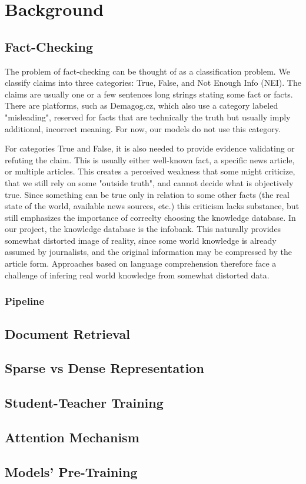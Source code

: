 \chapter{Background}

\section{Fact-Checking}

The problem of fact-checking can be thought of as a classification problem.
We classify claims into three categories: True, False, and Not Enough Info (NEI). 
The claims are usually one or a few sentences long strings stating some fact or facts. 
There are platforms, such as Demagog.cz, which also use a category labeled "misleading", reserved for facts that are technically the truth but usually imply additional, incorrect meaning.
For now, our models do not use this category.

For categories True and False, it is also needed to provide evidence validating or refuting the claim.
This is usually either well-known fact, a specific news article, or multiple articles. 
This creates a perceived weakness that some might criticize, that we still rely on some "outside truth", and cannot decide what is objectively true. 
Since something can be true only in relation to some other facts (the real state of the world, available news sources, etc.) this criticism lacks substance, but still emphasizes the importance of correclty choosing the knowledge database. 
In our project, the knowledge database is the \CTK{} infobank. 
This naturally provides somewhat distorted image of reality, since some world knowledge is already assumed by journalists, and the original information may be compressed by the article form. 
Approaches based on language comprehension therefore face a challenge of infering real world knowledge from somewhat distorted data. 

\subsection{Pipeline}

\section{Document Retrieval}
\section{Sparse vs Dense Representation}
\section{Student-Teacher Training}
\section{Attention Mechanism}
\section{Models' Pre-Training}